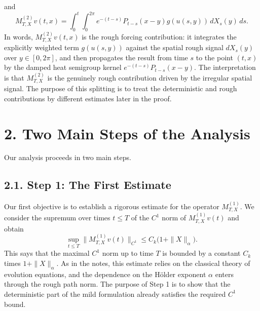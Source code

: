 \documentclass[11pt]{article}
\theoremstyle{definition}
\theoremstyle{remark}
\begin{document}
and
\[
M_{T,X}^{(2)}v(t,x)=\int_0^t\int_0^{2\pi} e^{-(t-s)}P_{t-s}(x-y)g(u(s,y))\,dX_s(y)\,ds.
\]
In words, $M_{T,X}^{(2)}v(t,x)$ is the rough forcing contribution: it integrates the explicitly weighted term $g(u(s,y))$ against the spatial rough signal $dX_s(y)$ over $y\in[0,2\pi]$, and then propagates the result from time $s$ to the point $(t,x)$ by the damped heat semigroup kernel $e^{-(t-s)}P_{t-s}(x-y)$.
The interpretation is that $M_{T,X}^{(2)}$ is the genuinely rough contribution driven by the irregular spatial signal.
The purpose of this splitting is to treat the deterministic and rough contributions by different estimates later in the proof.

\section*{2. Two Main Steps of the Analysis}
Our analysis proceeds in two main steps.

\subsection*{2.1. Step 1: The First Estimate}
Our first objective is to establish a rigorous estimate for the operator $M_{T,X}^{(1)}$. We consider the supremum over times $t\leq T$ of the $C^1$ norm of $M_{T,X}^{(1)}v(t)$ and obtain
\[
\sup_{t\le T}\|M_{T,X}^{(1)}v(t)\|_{C^1}\le C_k\bigl(1+\|X\|_\alpha\bigr).
\]
This says that the maximal $C^1$ norm up to time $T$ is bounded by a constant $C_k$ times $1+\|X\|_\alpha$. As in the notes, this estimate relies on the classical theory of evolution equations, and the dependence on the H\"older exponent $\alpha$ enters through the rough path norm.
The purpose of Step 1 is to show that the deterministic part of the mild formulation already satisfies the required $C^1$ bound.
\end{document}
